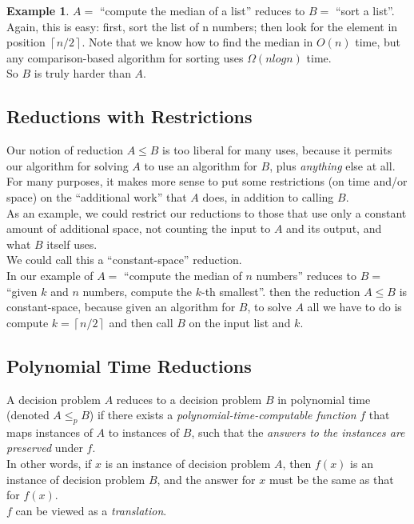 \documentclass[12pt]{article}
\theoremstyle{plain}
\theoremstyle{definition}
\newtheorem*{ex*}{Example}
\newcommand{\lecture}[1]{\marginpar{{\footnotesize $\leftarrow$ \underline{#1}}}}
\newcommand{\ceil}[1]{\ensuremath{\left\lceil #1 \right\rceil}}
\begin{document}
\begin{ex*}
$A =$ ``compute the median of a list'' reduces to $B =$ ``sort a list''. \\
Again, this is easy: first, sort the list of n numbers;
then look for the element in position $\ceil{n/2}$.
Note that we know how to find the median in $O(n)$ time, but any comparison-based algorithm for sorting uses $\Omega(n log n)$ time. \\
So $B$ is truly harder than $A$.
\end{ex*}

\subsection{Reductions with Restrictions}
Our notion of reduction $A \leq B$ is too liberal for many uses, because it permits our algorithm for solving $A$ to use an algorithm for $B$, plus \emph{anything} else at all. \\
For many purposes, it makes more sense to put some restrictions (on time and/or space) on the ``additional work'' that $A$ does, in addition to calling $B$. \\

As an example, we could restrict our reductions to those that use only a constant amount of additional space, not counting the input to $A$ and its output, and what $B$ itself uses. \\
We could call this a ``constant-space'' reduction. \\
In our example of $A =$ ``compute the median of $n$ numbers'' reduces to $B =$ ``given $k$ and $n$ numbers, compute the $k$-th smallest''. then the reduction $A \leq B$ is constant-space, because given an algorithm for $B$, to solve $A$ all we have to do is compute $k = \ceil{n/2}$ and then call $B$ on the input list and $k$.

\subsection{Polynomial Time Reductions}
\lecture{2016/11/22}
A decision problem $A$ reduces to a decision problem $B$ in polynomial time (denoted $A \leq_{p} B$) if there exists a \emph{polynomial-time-computable function} $f$ that maps instances of $A$ to instances of $B$, such that the \emph{answers to the instances are preserved} under $f$. \\
In other words, if $x$ is an instance of decision problem $A$, then $f(x)$ is an instance of decision problem $B$, and the answer for $x$ must be the same as that for $f(x)$. \\
$f$ can be viewed as a \emph{translation}.
\end{document}
